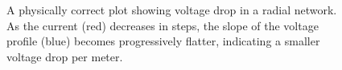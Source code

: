 \documentclass[11pt, a4paper]{article}
\begin{document}
\begin{figure}[h!]
    
    \caption{A physically correct plot showing voltage drop in a radial network. As the current (red) decreases in steps, the slope of the voltage profile (blue) becomes progressively flatter, indicating a smaller voltage drop per meter.}
\end{figure}
\end{document}
